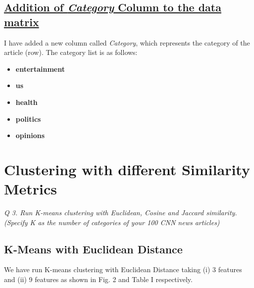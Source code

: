 \documentclass[journal,onecolumn]{IEEEtran}
\begin{document}
\subsection{\underline{Addition of \textit{Category} Column to the data matrix}}

I have added a new column called \textit{Category}, which represents the category of the article (row). The category list is as follows:
\begin{itemize}
\item \textbf{entertainment} %
\item \textbf{us } %
\item \textbf{health} %
\item \textbf{politics} %
\item \textbf{opinions}%
\end{itemize}

\section{Clustering with different Similarity Metrics}
\textit{Q 3. Run K-means clustering with Euclidean, Cosine and Jaccard similarity. (Specify K as the number of categories of your 100 CNN news articles)}


\subsection{K-Means with Euclidean Distance}
We have run K-means clustering with Euclidean Distance taking (i) 3 features and (ii) 9 features as shown in Fig. 2 and Table I respectively.
\end{document}
